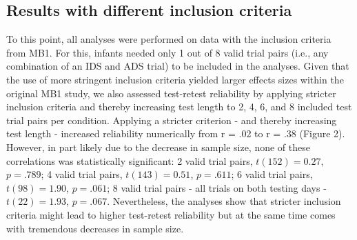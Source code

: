 \documentclass[
  man,floatsintext]{apa6}
\begin{document}
\hypertarget{results-with-different-inclusion-criteria}{%
\subsection{Results with different inclusion criteria}\label{results-with-different-inclusion-criteria}}

To this point, all analyses were performed on data with the inclusion criteria from MB1. For this, infants needed only 1 out of 8 valid trial pairs (i.e., any combination of an IDS and ADS trial) to be included in the analyses. Given that the use of more stringent inclusion criteria yielded larger effects sizes within the original MB1 study, we also assessed test-retest reliability by applying stricter inclusion criteria and thereby increasing test length to 2, 4, 6, and 8 included test trial pairs per condition. Applying a stricter criterion - and thereby increasing test length - increased reliability numerically from r = .02 to r = .38 (Figure 2). However, in part likely due to the decrease in sample size, none of these correlations was statistically significant: 2 valid trial pairs, \(t(152) = 0.27\), \(p = .789\); 4 valid trial pairs, \(t(143) = 0.51\), \(p = .611\); 6 valid trial pairs, \(t(98) = 1.90\), \(p = .061\); 8 valid trial pairs - all trials on both testing days - \(t(22) = 1.93\), \(p = .067\). Nevertheless, the analyses show that stricter inclusion criteria might lead to higher test-retest reliability but at the same time comes with tremendous decreases in sample size.
\end{document}
